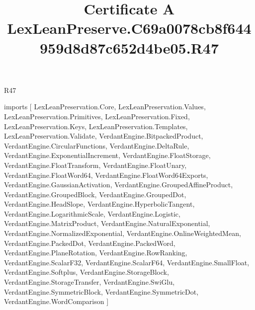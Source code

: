 \begin{lexlean}{R47}
\title{Certificate A LexLeanPreserve.C69a0078cb8f644959d8d87c652d4be05.R47}
\begin{coremodule}
imports [
  LexLeanPreservation.Core,
  LexLeanPreservation.Values,
  LexLeanPreservation.Primitives,
  LexLeanPreservation.Fixed,
  LexLeanPreservation.Keys,
  LexLeanPreservation.Templates,
  LexLeanPreservation.Validate,
  VerdantEngine.BitpackedProduct,
  VerdantEngine.CircularFunctions,
  VerdantEngine.DeltaRule,
  VerdantEngine.ExponentialIncrement,
  VerdantEngine.FloatStorage,
  VerdantEngine.FloatTransform,
  VerdantEngine.FloatUnary,
  VerdantEngine.FloatWord64,
  VerdantEngine.FloatWord64Exports,
  VerdantEngine.GaussianActivation,
  VerdantEngine.GroupedAffineProduct,
  VerdantEngine.GroupedBlock,
  VerdantEngine.GroupedDot,
  VerdantEngine.HeadSlope,
  VerdantEngine.HyperbolicTangent,
  VerdantEngine.LogarithmicScale,
  VerdantEngine.Logistic,
  VerdantEngine.MatrixProduct,
  VerdantEngine.NaturalExponential,
  VerdantEngine.NormalizedExponential,
  VerdantEngine.OnlineWeightedMean,
  VerdantEngine.PackedDot,
  VerdantEngine.PackedWord,
  VerdantEngine.PlaneRotation,
  VerdantEngine.RowRanking,
  VerdantEngine.ScalarF32,
  VerdantEngine.ScalarF64,
  VerdantEngine.SmallFloat,
  VerdantEngine.Softplus,
  VerdantEngine.StorageBlock,
  VerdantEngine.StorageTransfer,
  VerdantEngine.SwiGlu,
  VerdantEngine.SymmetricBlock,
  VerdantEngine.SymmetricDot,
  VerdantEngine.WordComparison
]


\end{coremodule}
\end{lexlean}
